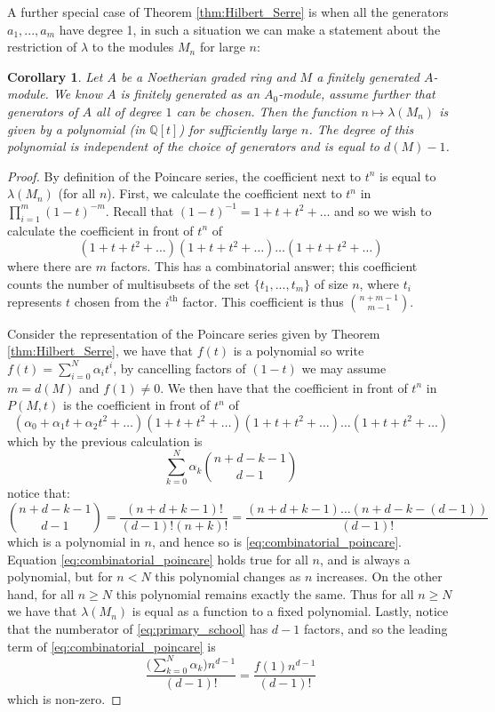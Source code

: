 \documentclass[12pt]{article}
\theoremstyle{plain}
\newtheorem{cor}[thm]{Corollary}
\theoremstyle{definition}
\newcommand{\bb}[1]{\mathbb{#1}}
\begin{document}
A further special case of Theorem \ref{thm:Hilbert_Serre} is when all the generators $a_1,...,a_m$ have degree 1, in such a situation we can make a statement about the restriction of $\lambda$ to the modules $M_n$ for large $n$:
\begin{cor}
\label{cor:polynomial}
Let $A$ be a Noetherian graded ring and $M$ a finitely generated $A$-module. We know $A$ is finitely generated as an $A_0$-module, assume further that generators of $A$ all of degree $1$ can be chosen. Then the function $n \mapsto \lambda(M_n)$ is given by a polynomial (in $\bb{Q}[t]$) for sufficiently large $n$. The degree of this polynomial is independent of the choice of generators and is equal to $d(M)-1$.
\end{cor}
\begin{proof}
By definition of the Poincare series, the coefficient next to $t^n$ is equal to $\lambda(M_n)$ (for all $n$). First, we calculate the coefficient next to $t^n$ in $\prod_{i = 1}^m(1 - t)^{-m}$. Recall that $(1 - t)^{-1} = 1 + t + t^2 + \hdots$ and so we wish to calculate the coefficient in front of $t^n$ of
\[(1 + t + t^2 + \hdots)(1 + t + t^2 + \hdots)\hdots (1 + t + t^2 + \hdots)\]
where there are $m$ factors. This has a combinatorial answer; this coefficient counts the number of multisubsets of the set $\lbrace t_1,...,t_m\rbrace$ of size $n$, where $t_i$ represents $t$ chosen from the $i^{\text{th}}$ factor. This coefficient is thus ${n + m - 1 \choose m - 1}$.

Consider the representation of the Poincare series given by Theorem \ref{thm:Hilbert_Serre}, we have that $f(t)$ is a polynomial so write $f(t) = \sum_{i = 0}^N \alpha_i t^i$, by cancelling factors of $(1 - t)$ we may assume $m = d(M)$ and $f(1) \neq 0$. We then have that the coefficient in front of $t^n$ in $P(M,t)$ is the coefficient in front of $t^n$ of
\[(\alpha_0 + \alpha_1t + \alpha_2t^2 + \hdots)(1 + t + t^2 + \hdots)(1 + t + t^2 + \hdots)\hdots (1 + t + t^2 + \hdots)\]
which by the previous calculation is
\begin{equation}
\label{eq:combinatorial_poincare}
\sum_{k = 0}^N\alpha_k{n  + d - k - 1 \choose d - 1}
\end{equation}
notice that:
\begin{equation}
\label{eq:primary_school}
{n  + d - k - 1 \choose d - 1} = \frac{(n + d + k - 1)!}{(d-1)!(n+k)!} = \frac{(n+d+k-1)\hdots(n+d-k-(d-1))}{(d-1)!}
\end{equation}
which is a polynomial in $n$, and hence so is \eqref{eq:combinatorial_poincare}. Equation \eqref{eq:combinatorial_poincare} holds true for all $n$, and is always a polynomial, but for $n < N$ this polynomial changes as $n$ increases. On the other hand, for all $n \geq N$ this polynomial remains exactly the same. Thus for all $n \geq N$ we have that $\lambda(M_n)$ is equal as a function to a fixed polynomial. Lastly, notice that the numberator of \eqref{eq:primary_school} has $d - 1$ factors, and so the leading term of \eqref{eq:combinatorial_poincare} is \[\frac{\big(\sum_{k = 0}^N\alpha_k\big)n^{d-1}}{(d-1)!} = \frac{f(1)n^{d-1}}{(d-1)!}\] which is non-zero.
\end{proof}
\end{document}
